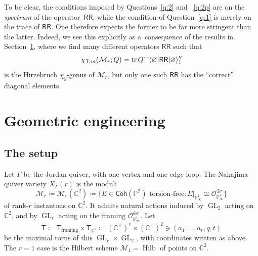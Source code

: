 \documentclass[10pt,a4paper]{amsart}
\numberwithin{equation}{section}
\newcommand{\cat}[1]{\mathsf{#1}}
\newcommand{\bC}{\mathbb{C}}
\newcommand{\bP}{\mathbb{P}}
\newcommand{\cM}{\mathcal{M}}
\newcommand{\cO}{\mathcal{O}}
\newcommand{\kQ}{Q}
\newcommand{\sT}{\mathsf{T}}
\newcommand{\sRR}{\mathsf{RR}}
\DeclareMathOperator{\GL}{GL}
\DeclareMathOperator{\Hilb}{Hilb}
\DeclareMathOperator{\tr}{tr}
\DeclarePairedDelimiter{\inner}{\langle}{\rangle}
\begin{document}
\begin{MyParagraph}\label{sec:RR-spectrum-vs-trace}
To be clear, the conditions imposed by Questions~\ref{q:2} and
~\ref{q:2p} are on the {\it spectrum} of the operator~$\sRR$, while
the condition of Question~\ref{q:1} is merely on the trace of $\sRR$.
One therefore expects the former to be far more stringent than the
latter. Indeed, we see this explicitly as a~consequence of the results
in Section~\ref{sec:geometric-engineering}, where we find many different
operators $\sRR$ such that
\[ \chi_{\sT,m}(\cM_r; \kQ) = \tr \kQ^{\cdots} \inner{\varnothing | \sRR | \varnothing}_1'' \]
is the Hirzebruch $\chi_y$-genus of $\cM_r$, but only one such $\sRR$
has the ``correct'' diagonal elements.
\end{MyParagraph}

\section{Geometric engineering}
\label{sec:geometric-engineering}

\subsection{The setup}
\label{sec:geometric-engineering-setup}

\begin{MyParagraph}
Let $\Gamma$ be the Jordan quiver, with one vertex and
one edge loop. The Nakajima quiver variety $X_\Gamma(r)$ is the moduli
\[ \cM_r \coloneqq \cM_r(\bC^2) \coloneqq \big\{E \in \cat{Coh}(\bP^2) \text{ torsion-free}\colon E\big|_{\bP^1_\infty} \cong \cO_{\bP^1_\infty}^{\oplus r}\big\} \]
of rank-$r$ instantons on $\bC^2$. It admits natural actions induced
by $\GL_2$ acting on $\bC^2$, and by $\GL_r$ acting on the framing
$\cO_{\bP^1_\infty}^{\oplus r}$. Let
\[ \sT \coloneqq \sT_{\text{framing}} \times \sT_{\bC^2} \coloneqq (\bC^\times)^r \times (\bC^\times)^2 \ni (a_1, \ldots, a_r, q, t) \]
be the maximal torus of this $\GL_r \times \GL_2$, with coordinates
written as above. The $r = 1$ case is the Hilbert scheme $\cM_1 =
\Hilb$ of points on $\bC^2$.
\end{MyParagraph}
\end{document}
